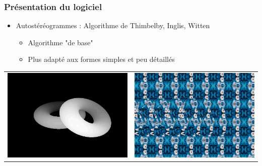 \documentclass{beamer}
\begin{document}
%
\begin{frame}
\frametitle{Présentation du logiciel}
\begin{itemize}[label=$\bullet$]
\item Autostéréogrammes : Algorithme de Thimbelby, Inglis, Witten \cite{stereogram}
	\begin{itemize}[label=$\circ$]
	\item Algorithme "de base"
	\item Plus adapté aux formes simples et peu détaillés
	\end{itemize}
\end{itemize}
\begin{tabular}{l|r}
\centering
\includegraphics[scale=0.22]{donutdepth.png}
&
\centering
\includegraphics[scale=0.22]{donut1.png}
\end{tabular}

\end{frame}
\end{document}
